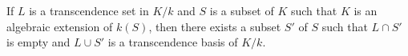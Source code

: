If $L$ is a transcendence set in $K/k$ and $S$ is a subset of $K$ such that $K$ is an algebraic extension of $k(S)$, then there exists a subset $S'$ of $S$ such that $L \cap S'$ is empty and $L \cup S'$ is a transcendence basis of $K/k$.
